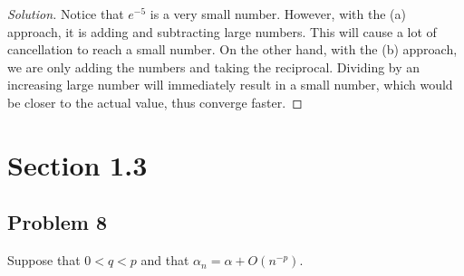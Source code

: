 \documentclass{article}
\begin{document}
\begin{enumerate}[label=\alph*.]
\begin{proof}[Solution]
        Notice that $e^{-5}$ is a very small number. However, with the (a) approach, it is adding 
        and subtracting large numbers. This will cause a lot of cancellation to reach a small number.
        On the other hand, with the (b) approach, we are only adding the numbers and taking the 
        reciprocal. Dividing by an increasing large number will immediately result in a small number, 
        which would be closer to the actual value, thus converge faster.
    \end{proof}
\end{enumerate}

\section*{Section 1.3}
\subsection*{Problem 8}
Suppose that $0 < q < p$ and that $\alpha_n = \alpha + O(n^{-p})$.
\end{document}
